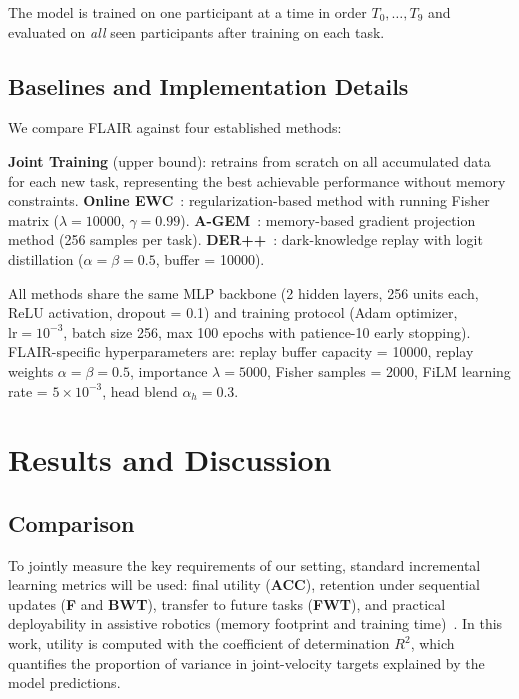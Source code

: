\documentclass[3p,times,procedia]{elsarticle}
\begin{document}
The model is trained on one participant at a time in order $T_0, \ldots, T_9$ and evaluated on \emph{all} seen participants after training on each task.

\subsection{Baselines and Implementation Details}

We compare FLAIR against four established methods:

\textbf{Joint Training} (upper bound): retrains from scratch on all accumulated data for each new task, representing the best achievable performance without memory constraints. \textbf{Online EWC}~\cite{schwarz2018progress}: regularization-based method with running Fisher matrix ($\lambda = 10000$, $\gamma = 0.99$). \textbf{A-GEM}~\cite{chaudhry2018efficient}: memory-based gradient projection method (256 samples per task). \textbf{DER++}~\cite{buzzega2020dark}: dark-knowledge replay with logit distillation ($\alpha = \beta = 0.5$, buffer = 10000).

All methods share the same MLP backbone (2 hidden layers, 256 units each, ReLU activation, dropout = 0.1) and training protocol (Adam optimizer, $\text{lr} = 10^{-3}$, batch size 256, max 100 epochs with patience-10 early stopping). FLAIR-specific hyperparameters are: replay buffer capacity = 10000, replay weights $\alpha = \beta = 0.5$, importance $\lambda = 5000$, Fisher samples = 2000, FiLM learning rate = $5 \times 10^{-3}$, head blend $\alpha_h = 0.3$.

\section{Results and Discussion}
\label{sec:results_discussion}

\subsection{Comparison}

To jointly measure the key requirements of our setting, standard incremental learning metrics will be used: final utility (\textbf{ACC}), retention under sequential updates (\textbf{F} and \textbf{BWT}), transfer to future tasks (\textbf{FWT}), and practical deployability in assistive robotics (memory footprint and training time)~\cite{lopez2017gradient}. In this work, utility is computed with the coefficient of determination $R^2$, which quantifies the proportion of variance in joint-velocity targets explained by the model predictions.%
\end{document}
